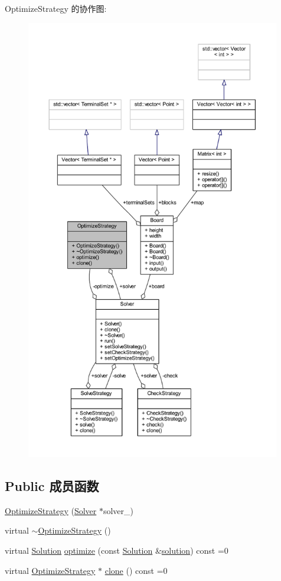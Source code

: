 Optimize\+Strategy 的协作图\+:
\nopagebreak
\begin{figure}[H]
\begin{center}
\leavevmode
\includegraphics[height=550pt]{classOptimizeStrategy__coll__graph}
\end{center}
\end{figure}
\subsection*{Public 成员函数}
\begin{DoxyCompactItemize}
\item 
\hyperlink{classOptimizeStrategy_a4d2e0bc2a8590dd000428896bc26b7f0}{Optimize\+Strategy} (\hyperlink{classSolver}{Solver} $\ast$solver\+\_\+)
\item 
virtual \hyperlink{classOptimizeStrategy_ae6ec4ccf210c79fccbede891814584c5}{$\sim$\+Optimize\+Strategy} ()
\item 
virtual \hyperlink{classSolution}{Solution} \hyperlink{classOptimizeStrategy_a2ac1b1c33fa54a59e6f3a9daffcbf4eb}{optimize} (const \hyperlink{classSolution}{Solution} \&\hyperlink{classes_8txt_aa43d5190bbc491d9c9134146e01a248e}{solution}) const  =0
\item 
virtual \hyperlink{classOptimizeStrategy}{Optimize\+Strategy} $\ast$ \hyperlink{classOptimizeStrategy_a3cf14f98ef8800d2e6c67ddd610edcbd}{clone} () const  =0
\end{DoxyCompactItemize}
